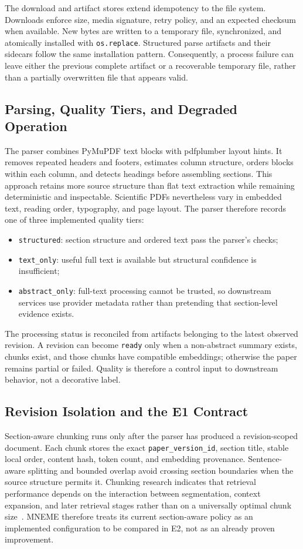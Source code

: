 The download and artifact stores extend idempotency to the file system. Downloads enforce size, media signature, retry policy, and an expected checksum when available. New bytes are written to a temporary file, synchronized, and atomically installed with \texttt{os.replace}. Structured parse artifacts and their sidecars follow the same installation pattern. Consequently, a process failure can leave either the previous complete artifact or a recoverable temporary file, rather than a partially overwritten file that appears valid.

\subsection{Parsing, Quality Tiers, and Degraded Operation}

The parser combines PyMuPDF text blocks with pdfplumber layout hints. It removes repeated headers and footers, estimates column structure, orders blocks within each column, and detects headings before assembling sections. This approach retains more source structure than flat text extraction while remaining deterministic and inspectable. Scientific PDFs nevertheless vary in embedded text, reading order, typography, and page layout. The parser therefore records one of three implemented quality tiers:
\begin{itemize}
  \item \texttt{structured}: section structure and ordered text pass the parser's checks;
  \item \texttt{text\_only}: useful full text is available but structural confidence is insufficient;
  \item \texttt{abstract\_only}: full-text processing cannot be trusted, so downstream services use provider metadata rather than pretending that section-level evidence exists.
\end{itemize}
The processing status is reconciled from artifacts belonging to the latest observed revision. A revision can become \texttt{ready} only when a non-abstract summary exists, chunks exist, and those chunks have compatible embeddings; otherwise the paper remains partial or failed. Quality is therefore a control input to downstream behavior, not a decorative label.

\subsection{Revision Isolation and the E1 Contract}

Section-aware chunking runs only after the parser has produced a revision-scoped document. Each chunk stores the exact \texttt{paper\_version\_id}, section title, stable local order, content hash, token count, and embedding provenance. Sentence-aware splitting and bounded overlap avoid crossing section boundaries when the source structure permits it. Chunking research indicates that retrieval performance depends on the interaction between segmentation, context expansion, and later retrieval stages rather than on a universally optimal chunk size~\cite{wang2024bestpractices}. MNEME therefore treats its current section-aware policy as an implemented configuration to be compared in E2, not as an already proven improvement.

